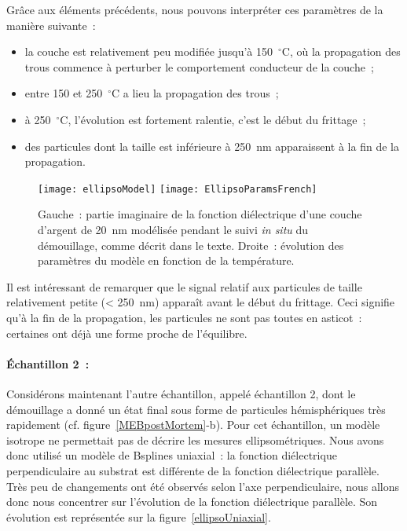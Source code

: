 Grâce aux éléments précédents, nous pouvons interpréter ces paramètres de la manière suivante~:
\begin{itemize}
\item la couche est relativement peu modifiée jusqu'à 150~$^\circ$C, où la propagation des trous commence à perturber le comportement conducteur de la couche~;
\item entre 150 et 250~$^\circ$C a lieu la propagation des trous~;
\item à 250~$^\circ$C, l'évolution est fortement ralentie, c'est le début du frittage~;
\item des particules dont la taille est inférieure à 250~nm apparaissent à la fin de la propagation.
\end{itemize}

\begin{figure}[h]
	\centering
	\texttt{[image: ellipsoModel]} \texttt{[image: EllipsoParamsFrench]}
	\caption{Gauche~: partie imaginaire de la fonction diélectrique d'une couche d'argent de 20~nm modélisée pendant le suivi \textit{in situ} du démouillage, comme décrit dans le texte. Droite~: évolution des paramètres du modèle en fonction de la température.}
	\label{EllipsoInSitu1}
\end{figure}

Il est intéressant de remarquer que le signal relatif aux particules de taille relativement petite (< 250~nm) apparaît avant le début du frittage. Ceci signifie qu'à la fin de la propagation, les particules ne sont pas toutes en asticot~: certaines ont déjà une forme proche de l'équilibre.\par

\paragraph{Échantillon 2~:}
Considérons maintenant l'autre échantillon, appelé échantillon 2, dont le démouillage a donné un état final sous forme de particules hémisphériques très rapidement (cf. figure~\ref{MEBpostMortem}-b). Pour cet échantillon, un modèle isotrope ne permettait pas de décrire les mesures ellipsométriques. Nous avons donc utilisé un modèle de Bsplines uniaxial~: la fonction diélectrique perpendiculaire au substrat est différente de la fonction diélectrique parallèle. Très peu de changements ont été observés selon l'axe perpendiculaire, nous allons donc nous concentrer sur l'évolution de la fonction diélectrique parallèle. Son évolution est représentée sur la figure~\ref{ellipsoUniaxial}.

